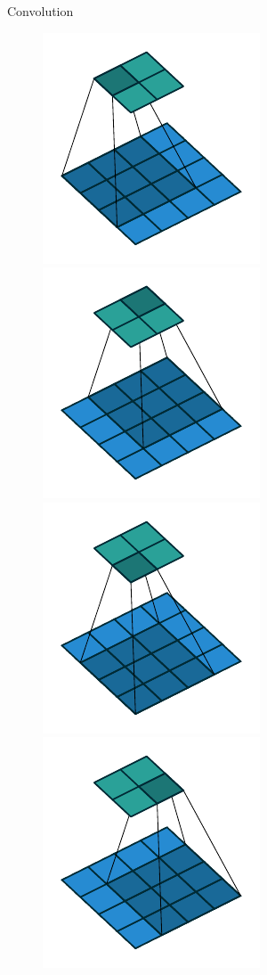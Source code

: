 \documentclass{beamer}
\begin{document}
    \begin{frame}{Convolution}
        \begin{figure}
            \centering
            \includegraphics[scale=0.7]{./figures/no_padding_no_strides_00.pdf}
            \includegraphics[scale=0.7]{./figures/no_padding_no_strides_01.pdf} \\
            \includegraphics[scale=0.7]{./figures/no_padding_no_strides_02.pdf}
            \includegraphics[scale=0.7]{./figures/no_padding_no_strides_03.pdf}

\end{figure}
\end{frame}
\end{document}
